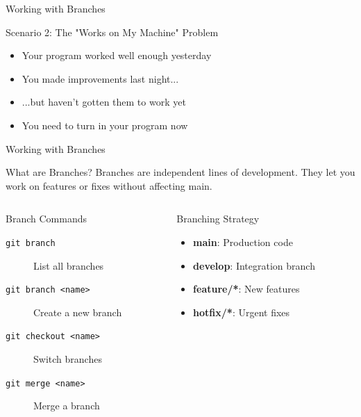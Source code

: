 \documentclass[aspectratio=169]{beamer}
\begin{document}


\begin{frame}{Working with Branches}
\begin{block}{Scenario 2: The "Works on My Machine" Problem}
\begin{itemize}
  \item Your program worked well enough yesterday
  \item You made improvements last night...
  \item ...but haven't gotten them to work yet
  \item You need to turn in your program now
\end{itemize}
\end{block}



\end{frame}
\begin{frame}{Working with Branches}
  \begin{block}{What are Branches?}
    Branches are independent lines of development. They let you work on features or fixes without affecting main.
  \end{block}

  \begin{columns}
    \begin{column}{0.48\textwidth}
      \begin{block}{Branch Commands}
        \begin{description}
          \item[\texttt{git branch}] List all branches
          \item[\texttt{git branch <name>}] Create a new branch
          \item[\texttt{git checkout <name>}] Switch branches
          \item[\texttt{git merge <name>}] Merge a branch
        \end{description}
      \end{block}
    \end{column}
    \begin{column}{0.48\textwidth}
      \begin{exampleblock}{Branching Strategy}
        \begin{itemize}
          \item \textbf{main}: Production code
          \item \textbf{develop}: Integration branch
          \item \textbf{feature/*}: New features
          \item \textbf{hotfix/*}: Urgent fixes
        \end{itemize}
      \end{exampleblock}
    \end{column}
  \end{columns}
\end{frame}
\end{document}
